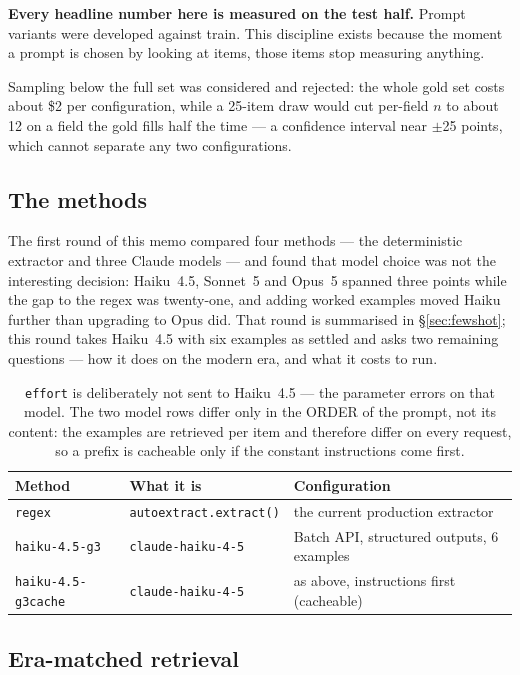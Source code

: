 \documentclass[11pt]{article}
\begin{document}
\textbf{Every headline number here is measured on the test half.} Prompt variants were
developed against train. This discipline exists because the moment a prompt is chosen by
looking at items, those items stop measuring anything.

Sampling below the full set was considered and rejected: the whole gold set costs about \$2
per configuration, while a 25-item draw would cut per-field $n$ to about 12 on a field the
gold fills half the time --- a confidence interval near $\pm$25 points, which cannot separate
any two configurations.

\subsection{The methods}

The first round of this memo compared four methods --- the deterministic extractor and three
Claude models --- and found that model choice was not the interesting decision: Haiku~4.5,
Sonnet~5 and Opus~5 spanned three points while the gap to the regex was twenty-one, and
adding worked examples moved Haiku further than upgrading to Opus did. That round is
summarised in \S\ref{sec:fewshot}; this round takes Haiku~4.5 with six examples as settled
and asks two remaining questions --- how it does on the modern era, and what it costs to run.

\begin{table}[h]
\centering
\begin{tabular}{lll}
\toprule
Method & What it is & Configuration \\
\midrule
\texttt{regex} & \texttt{autoextract.extract()} & the current production extractor \\
\texttt{haiku-4.5-g3} & \texttt{claude-haiku-4-5} & Batch API, structured outputs, 6 examples \\
\texttt{haiku-4.5-g3cache} & \texttt{claude-haiku-4-5} & as above, instructions first (cacheable) \\
\bottomrule
\end{tabular}
\caption{\texttt{effort} is deliberately not sent to Haiku~4.5 --- the parameter errors on
that model. The two model rows differ only in the ORDER of the prompt, not its content: the
examples are retrieved per item and therefore differ on every request, so a prefix is
cacheable only if the constant instructions come first.}
\end{table}

\subsection{Era-matched retrieval}
\end{document}
